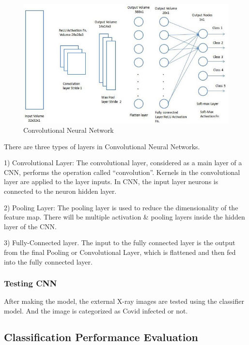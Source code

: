  
\begin{figure}[!h]
    \centering
    \includegraphics[width=\textwidth]{assets/cnn2.png}
    \caption{Convolutional Neural Network ~\cite{Uddin2021}}
\end{figure}

There are three types of layers in Convolutional Neural Networks.  

1) Convolutional Layer: The convolutional layer, considered as a main layer of a CNN, performs the operation called “convolution”. Kernels in the convolutional layer are applied to the layer inputs. In CNN, the input layer neurons is connected to the neuron hidden layer.  

2) Pooling Layer: The pooling layer is used to reduce the dimensionality of the feature map. There will be multiple activation \& pooling layers inside the hidden layer of the CNN. 

3) Fully-Connected layer. The input to the fully connected layer is the output from the final Pooling or Convolutional Layer, which is flattened and then fed into the fully connected layer. 

 

 

 

 

 

\subsubsection{Testing CNN}

After making the model, the external X-ray images are tested using the classifier model. And the image is categorized as Covid infected or not. 

 

\subsection{Classification Performance Evaluation}

